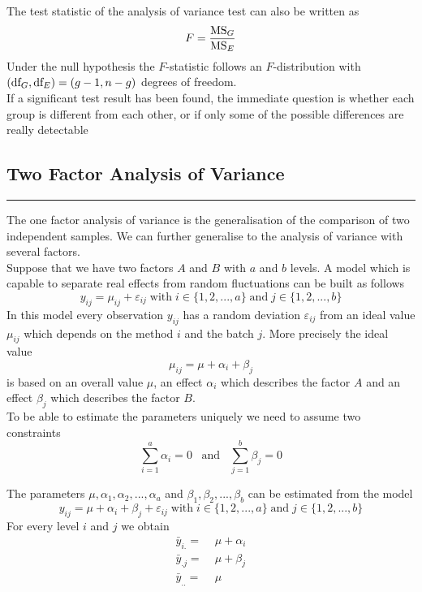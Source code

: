 The test statistic of the analysis of variance test can also be written as
\begin{equation}
  F = \frac{\textup{MS}_G}{\textup{MS}_E}
\end{equation}
Under the null hypothesis the $F$-statistic follows an $F$-distribution with $(\textup{df}_G, \textup{df}_E) = (g - 1, n - g)$ degrees of freedom.\\
If a significant test result has been found, the immediate question is whether each group is different from each other, or if only some of the possible differences are really detectable

\subsection{Two Factor Analysis of Variance}
\noindent\rule[\linienAbstand]{\linewidth}{\linienDicke}
The one factor analysis of variance is the generalisation of the comparison of two independent samples. We can further generalise to the analysis of variance with several factors.\\
Suppose that we have two factors $A$ and $B$ with $a$ and $b$ levels. A model which is capable to separate real effects from random fluctuations can be built as follows
\begin{equation}
  y_{ij} = \mu_{ij} + \varepsilon_{ij} \;\text{with}\; i \in \{1, 2, ..., a\} \;\text{and}\; j \in \{1, 2, ...,b\}
\end{equation}
In this model every observation $y_{ij}$ has a random deviation $\varepsilon_{ij}$ from an ideal value $\mu_{ij}$ which depends on the method $i$ and the batch $j$. More precisely the ideal value
\begin{equation}
  \mu_{ij} = \mu + \alpha_i + \beta_j
\end{equation}
is based on an overall value $\mu$, an effect $\alpha_i$ which describes the factor $A$ and an effect $\beta_j$ which describes the factor $B$.\\
To be able to estimate the parameters uniquely we need to assume two constraints
\begin{equation}
  \sum_{i=1}^{a} \alpha_i = 0 \;\;\; \text{and} \;\;\; \sum_{j=1}^b \beta_j = 0
\end{equation}

The parameters $\mu, \alpha_1, \alpha_2, . . . , \alpha_a$ and $\beta_1, \beta_2, . . . , \beta_b$ can be estimated from the model
\begin{equation}
  y_{ij} = \mu + \alpha_i + \beta_j + \varepsilon_{ij} \;\text{with}\; i \in \{1, 2, ..., a\} \;\text{and}\; j \in \{1, 2, ...,b\}
\end{equation}
For every level $i$ and $j$ we obtain
\begin{equation}
  \begin{split}
    \bar{y}_{i.} =& \; \mu + \alpha_i\\
    \bar{y}_{.j} =& \; \mu + \beta_j\\
    \bar{y}_{..} =& \; \mu
      \end{split}
\end{equation}

